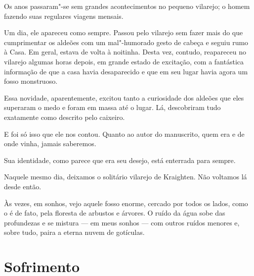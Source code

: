 Os anos passaram"-se sem grandes acontecimentos no pequeno vilarejo; o homem fazendo suas regulares viagens mensais.

Um dia, ele apareceu como sempre. Passou pelo vilarejo sem fazer mais do que cumprimentar os aldeões com um mal"-humorado
gesto de cabeça e seguiu rumo à Casa. Em geral, estava de volta à noitinha. Desta vez, contudo, reapareceu no
vilarejo algumas horas depois, em grande estado de excitação, com a fantástica informação de que a casa havia
desaparecido e que em seu lugar havia agora um fosso monstruoso.

Essa novidade, aparentemente, excitou tanto a curiosidade dos aldeões que eles superaram o medo e foram em massa até o
lugar. Lá, descobriram tudo exatamente como descrito pelo caixeiro.

E foi só isso que ele nos contou. Quanto ao autor do manuscrito, quem era e de onde vinha, jamais saberemos.

Sua identidade, como parece que era seu desejo, está enterrada para sempre.

Naquele mesmo dia, deixamos o solitário vilarejo de Kraighten. Não voltamos lá desde então.

Às vezes, em sonhos, vejo aquele fosso enorme, cercado por todos os lados, como o é de fato, pela floresta de arbustos e
árvores. O ruído da água sobe das profundezas e se mistura --- em meus sonhos --- com outros ruídos menores e, sobre
tudo, paira a eterna nuvem de gotículas.


\cleardoublepage

\chapter{Sofrimento}

